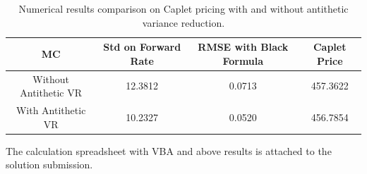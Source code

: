 \documentclass[a4paper,11pt] {article}
\begin{document}
\begin{table}
  \centering
  \begin{tabular}{|c|c|c|c|} 
  \hline
  MC & Std on Forward Rate & RMSE with Black Formula & Caplet Price \\ \hline
  Without Antithetic VR  & 12.3812 & 0.0713 & 457.3622 \\
  With Antithetic VR & 10.2327 & 0.0520 & 456.7854 \\
  \hline
  \end{tabular}
  \caption{Numerical results comparison on Caplet pricing with and without antithetic variance reduction.}\label{tbl::numerical_ret}
\end{table}

The calculation spreadsheet with VBA and above results is attached to the solution submission.
\end{document}
